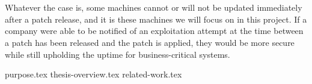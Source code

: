\documentclass{report}
\begin{document}
\\
\\
Whatever the case is, some machines cannot or will not be updated immediately after a patch release, and it is these machines we will focus on in this project. If a company were able to be notified of an exploitation attempt at the time between a patch has been released and the patch is applied, they would be more secure while still upholding the uptime for business-critical systems.

{purpose.tex}
{thesis-overview.tex}
{related-work.tex}

\end{document}
